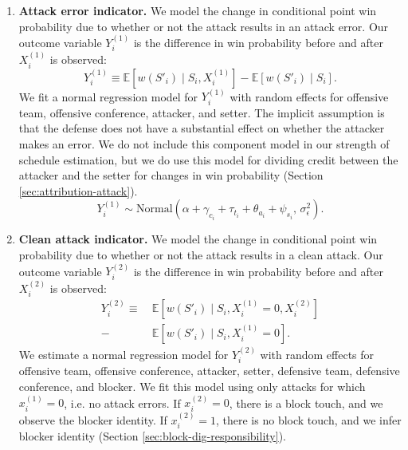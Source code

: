 \documentclass[USenglish]{article}
\theoremstyle{dgthm}
\theoremstyle{dgdef}
\begin{document}
\begin{enumerate}
    \item
        {\bf Attack error indicator.} We model the change in conditional point win probability due to whether or not the attack results in an attack error. Our outcome variable $Y_i^{(1)}$ is the difference in win probability before and after $X_i^{(1)}$ is observed:
        \begin{equation*}
            Y_i^{(1)} \equiv \mathbb{E}\left[w(S'_i) \mid S_i, X_i^{(1)}\right] - \mathbb{E}\left[w(S'_i) \mid S_i\right].
        \end{equation*}
        We fit a normal regression model for $Y_i^{(1)}$ with random effects for offensive team, offensive conference, attacker, and setter. The implicit assumption is that the defense does not have a substantial effect on whether the attacker makes an error. We do not include this component model in our strength of schedule estimation, but we do use this model for dividing credit between the attacker and the setter for changes in win probability (Section \ref{sec:attribution-attack}).
        \begin{equation}
        \label{eqn:attack-model-1}
            Y_i^{(1)} \sim \mbox{Normal}\left(
                \alpha + \gamma_{c_i} + \tau_{t_i} + \theta_{a_i} + \psi_{s_i},\,
                \sigma^2_\epsilon
            \right).
        \end{equation}
    \item
        {\bf Clean attack indicator.} We model the change in conditional point win probability due to whether or not the attack results in a clean attack. Our outcome variable $Y_i^{(2)}$ is the difference in win probability before and after $X_i^{(2)}$ is observed:
        \begin{align*}
            Y_i^{(2)} \equiv &~\mathbb{E}\left[w(S'_i) \mid S_i, X_i^{(1)} = 0, X_i^{(2)}\right]\\
            - &~\mathbb{E}\left[w(S'_i) \mid S_i, X_i^{(1)} = 0\right].
        \end{align*}
        We estimate a normal regression model for $Y_i^{(2)}$ with random effects for offensive team, offensive conference, attacker, setter, defensive team, defensive conference, and blocker. We fit this model using only attacks for which $x_i^{(1)} = 0$, i.e. no attack errors. If $x_i^{(2)} = 0$, there is a block touch, and we observe the blocker identity. If $x_i^{(2)} = 1$, there is no block touch, and we infer blocker identity (Section \ref{sec:block-dig-responsibility}).

\end{enumerate}
\end{document}
